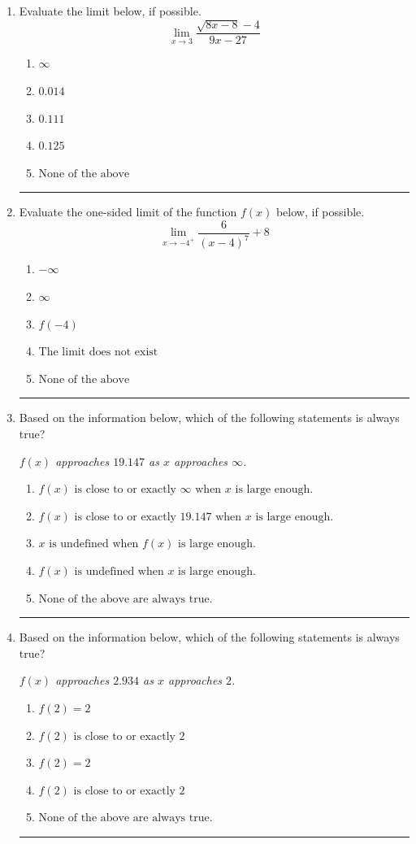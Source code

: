\documentclass[14pt]{extbook}
\newcommand{\litem}[1]{\item#1\hspace*{-1cm}\rule{\textwidth}{0.4pt}}
\begin{document}
\begin{enumerate}
\litem{
Evaluate the limit below, if possible.\[ \lim_{x \rightarrow 3} \frac{\sqrt{8x - 8} - 4}{9x - 27} \]\begin{enumerate}[label=\Alph*.]
\item \( \infty \)
\item \( 0.014 \)
\item \( 0.111 \)
\item \( 0.125 \)
\item \( \text{None of the above} \)

\end{enumerate} }
\litem{
Evaluate the one-sided limit of the function $f(x)$ below, if possible.\[ \lim_{x \rightarrow -4^+} \frac{6}{(x-4)^7}+8 \]\begin{enumerate}[label=\Alph*.]
\item \( -\infty \)
\item \( \infty \)
\item \( f(-4) \)
\item \( \text{The limit does not exist} \)
\item \( \text{None of the above} \)

\end{enumerate} }
\litem{
Based on the information below, which of the following statements is always true?
\begin{center}
    \textit{ $f(x)$ approaches $19.147$ as $x$ approaches $\infty$. }
\end{center}
\begin{enumerate}[label=\Alph*.]
\item \( f(x) \text{ is close to or exactly } \infty \text{ when } x \text{ is large enough}. \)
\item \( f(x) \text{ is close to or exactly } 19.147 \text{ when } x \text{ is large enough}. \)
\item \( x \text{ is undefined when } f(x) \text{ is large enough}. \)
\item \( f(x) \text{ is undefined when } x \text{ is large enough}. \)
\item \( \text{None of the above are always true.} \)

\end{enumerate} }
\litem{
Based on the information below, which of the following statements is always true?
\begin{center}
    \textit{ $f(x)$ approaches $2.934$ as $x$ approaches $2$. }
\end{center}
\begin{enumerate}[label=\Alph*.]
\item \( f(2) = 2 \)
\item \( f(2) \text{ is close to or exactly } 2 \)
\item \( f(2) = 2 \)
\item \( f(2) \text{ is close to or exactly } 2 \)
\item \( \text{None of the above are always true.} \)


\end{enumerate}}
\end{enumerate}
\end{document}
